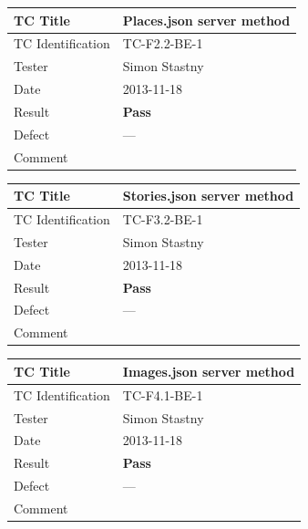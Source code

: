 \documentclass[11pt]{book}
\begin{document}

\begin{center}\begin{tabular}{| l | p{11cm} |} \hline
    TC Title          & Places.json server method                 \\ \hline 
    TC Identification & TC-F2.2-BE-1                              \\ \hline 
    Tester            & Simon Stastny                             \\ \hline 
    Date              & 2013-11-18                                \\ \hline 
    Result            & \textbf{Pass}                             \\ \hline 
    Defect            & ---                                       \\ \hline 
    Comment           &                                           \\
  \hline 
\end{tabular}\end{center}

\begin{center}\begin{tabular}{| l | p{11cm} |} \hline
    TC Title          & Stories.json server method                \\ \hline 
    TC Identification & TC-F3.2-BE-1                              \\ \hline 
    Tester            & Simon Stastny                             \\ \hline 
    Date              & 2013-11-18                                \\ \hline 
    Result            & \textbf{Pass}                             \\ \hline 
    Defect            & ---                                       \\ \hline 
    Comment           &                                           \\
  \hline 
\end{tabular}\end{center}

\begin{center}\begin{tabular}{| l | p{11cm} |} \hline
    TC Title          & Images.json server method                 \\ \hline 
    TC Identification & TC-F4.1-BE-1                              \\ \hline 
    Tester            & Simon Stastny                             \\ \hline 
    Date              & 2013-11-18                                \\ \hline 
    Result            & \textbf{Pass}                             \\ \hline 
    Defect            & ---                                       \\ \hline 
    Comment           &                                           \\
  \hline 
\end{tabular}\end{center}
\end{document}
